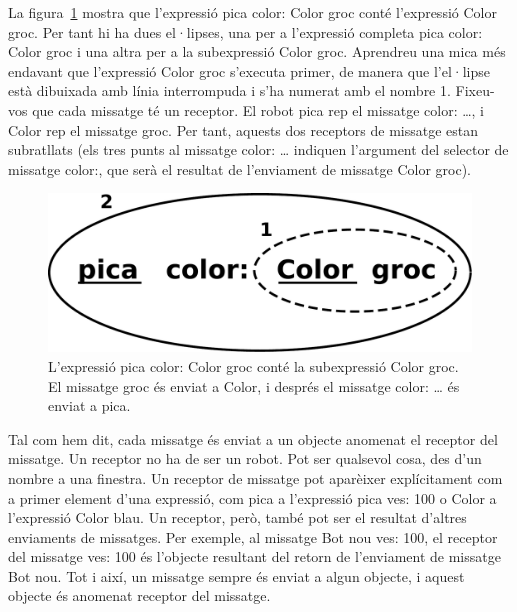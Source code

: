 La figura~\ref{fig1101} mostra que l'expressió \textsf{pica color: Color groc} conté l'expressió \textsf{Color groc}. Per tant hi ha dues el·lipses, una per a l'expressió completa \textsf{pica color: Color groc} i una altra per a la subexpressió \textsf{Color groc}. Aprendreu una mica més endavant que l'expressió \textsf{Color groc} s'executa primer, de manera que l'el·lipse està dibuixada amb línia interrompuda i s'ha numerat amb el nombre 1. Fixeu-vos que cada missatge té un receptor. El robot \textsf{pica} rep el missatge \textsf{color: \dots}, i \textsf{Color} rep el missatge \textsf{groc}. Per tant, aquests dos receptors de missatge estan subratllats (els tres punts al missatge \textsf{color: \dots} indiquen l'argument del selector de missatge \textsf{color:}, que serà el resultat de l'enviament de missatge \textsf{Color groc}). 
\begin{figure}[h]
\begin{center}
\includegraphics[scale=0.25]{Imatges/figura11-1.pdf}
\end{center}
\caption{L'expressió \textsf{\upshape pica color: Color groc} conté la subexpressió \textsf{\upshape Color groc}. El missatge \textsf{\upshape groc} és enviat a \textsf{\upshape Color}, i després el missatge \textsf{\upshape color: \dots} és enviat a \textsf{\upshape pica}.}
\label{fig1101}
\end{figure}

Tal com hem dit, cada missatge és enviat a un objecte anomenat el receptor del missatge. Un receptor no ha de ser un robot. Pot ser qualsevol cosa, des d'un nombre a una finestra. Un receptor de missatge pot aparèixer explícitament com a primer element d'una expressió, com \textsf{pica} a l'expressió \textsf{pica ves: 100} o \textsf{Color} a l'expressió \textsf{Color blau}. Un receptor, però, també pot ser el resultat d'altres enviaments de missatges. Per exemple, al missatge \textsf{Bot nou ves: 100}, el receptor del missatge \textsf{ves: 100} és l'objecte resultant del retorn de l'enviament de missatge \textsf{Bot nou}. Tot i així, un missatge sempre és enviat a algun objecte, i aquest objecte és anomenat receptor del missatge.   

